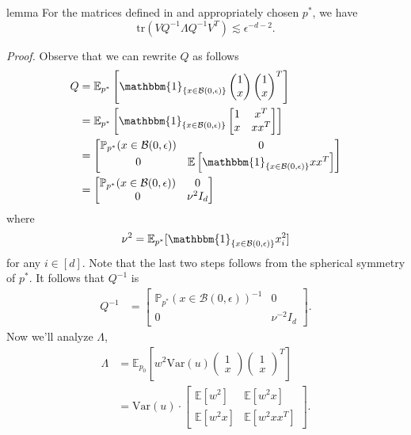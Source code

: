 \documentclass[11pt]{article}
\begin{document}
\begin{restatable}{lemma}{} \label{lemma: trace bound}
    For the matrices defined in  and appropriately chosen $p^*$, we have
    \[\text{tr}(VQ^{-1}\Lambda Q^{-1}V^T) \lesssim \epsilon^{-d-2}. \]
\end{restatable}
\noindent \textit{Proof.} Observe that we can rewrite $Q$ as follows
\begin{align}
    Q &= \mathbb{E}_{p^*}\left[\mathbbm{1}_{\{x \in \mathcal{B}(0, \epsilon)\}}\begin{pmatrix}
        1 \\ x
    \end{pmatrix}\begin{pmatrix}
        1 \\ x
    \end{pmatrix}^T\right] \\
    &= \mathbb{E}_{p^*}\left[\mathbbm{1}_{\{x \in \mathcal{B}(0, \epsilon)\}}
    \begin{bmatrix}
         1 & x^T \\
         x & xx^T
    \end{bmatrix}\right] \\
    &= \begin{bmatrix}
         \mathbb{P}_{p^*}(x \in \mathcal{B}(0, \epsilon)) & 0 \\
         0 & \mathbb{E}\left[\mathbbm{1}_{\{x \in \mathcal{B}(0, \epsilon)\}}xx^T\right]
    \end{bmatrix} \\
    &= \begin{bmatrix}
         \mathbb{P}_{p^*}(x \in \mathcal{B}(0, \epsilon)) & 0 \\
         0 & \nu^2I_d
    \end{bmatrix}
\end{align}
where
\[\nu^2 = \mathbb{E}_{p^*}[\mathbbm{1}_{\{x \in \mathcal{B}(0, \epsilon)\}}x_i^2]\]
for any $i \in [d]$. Note that the last two steps follows from the spherical symmetry of $p^*$. It follows that $Q^{-1}$ is
\begin{align}
    Q^{-1} &= \begin{bmatrix}
         \mathbb{P}_{p^*}(x \in \mathcal{B}(0, \epsilon))^{-1} & 0 \\
         0 & \nu^{-2}I_d
    \end{bmatrix}.
\end{align}
Now we'll analyze $\Lambda$, 
\begin{align}
    \Lambda &= \mathbb{E}_{p_0}\left[w^2\text{Var}(u)\begin{pmatrix}
        1 \\ x
    \end{pmatrix}\begin{pmatrix}
        1 \\ x
    \end{pmatrix}^T\right] \\
    &= 
    \text{Var}(u)\cdot\begin{bmatrix}
         \mathbb{E}[w^2] & \mathbb{E}[w^2x] \\
         \mathbb{E}[w^2x] & \mathbb{E}[w^2xx^T]
    \end{bmatrix}.
\end{align}
\end{document}
